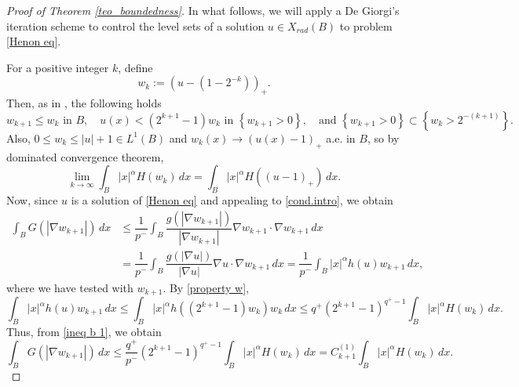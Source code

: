 \documentclass[leqno,twoside, 12pt]{amsart}
\theoremstyle{plain}
\numberwithin{equation}{section} \numberwithin{figure}{section}
\theoremstyle{definition}
\numberwithin{equation}{section}
\begin{document}
\begin{proof}[Proof of Theorem \ref{teo_boundedness}] In what follows, we will apply a De Giorgi's iteration scheme to control the level sets of a solution $u\in X_{rad}(B)$ to problem \eqref{Henon eq}.

For a positive integer $k$, define
$$w_{k}:= (u-(1-2^{-k}))_{+}.$$Then, as in \cite{FP}, the following holds
\begin{equation}\label{property w}
w_{k+1} \leq w_k \text{ in }B, \quad u(x)< (2^{k+1}-1)w_k \text{ in }\left\lbrace w_{k+1}>0\right\rbrace, \quad \text{and }\left\lbrace w_{k+1}>0\right\rbrace \subset \left\lbrace w_{k}>2^{-(k+1)}\right\rbrace. 
\end{equation} Also, $0 \leq w_k \leq |u|+1 \in L^1(B)$ and $w_k(x)\to (u(x)-1)_{+}$ a.e. in $B$, so by dominated convergence theorem,
\begin{equation}\label{convergence to u}
\lim_{k\to \infty}\int_B |x|^{\alpha}H(w_k)\,dx = \int_B |x|^\alpha H((u-1)_{+})\,dx.
\end{equation}
Now, since $u$ is a solution of \eqref{Henon eq} and appealing to \eqref{cond.intro}, we obtain
\begin{equation}\label{ineq b 1}
\begin{split}
\int_B G(|\nabla w_{k+1}|)\,dx & \leq \dfrac{1}{p^{-}}\int_B \dfrac{g(|\nabla w_{k+1}|)}{|\nabla w_{k+1}|}\nabla w_{k+1}\cdot \nabla w_{k+1}\,dx \\ & =  \dfrac{1}{p^{-}} \int_B \dfrac{g(|\nabla u|)}{|\nabla u|}\nabla u\cdot \nabla w_{k+1}\,dx = \dfrac{1}{p^{-}}\int_B |x|^{\alpha}h(u)w_{k+1}\,dx,
\end{split}
\end{equation}where we have tested with $w_{k+1}$. By \eqref{property w},
$$\int_B |x|^{\alpha}h(u)w_{k+1}\,dx \leq \int_B |x|^{\alpha}h\left((2^{k+1}-1)w_k\right)w_{k}\,dx \leq q^{+}(2^{k+1}-1)^{q^{+}-1}\int_B |x|^\alpha H(w_k)\,dx.$$
Thus, from \eqref{ineq b 1}, we obtain
\begin{equation}\label{ineq 100}
\int_B G(|\nabla w_{k+1}|)\,dx \leq \dfrac{q^{+}}{p^{-}}(2^{k+1}-1)^{q^{+}-1}\int_B |x|^\alpha H(w_k)\,dx = C^{(1)}_{k+1}\int_B |x|^\alpha H(w_k)\,dx.
\end{equation}


\end{proof}
\end{document}
